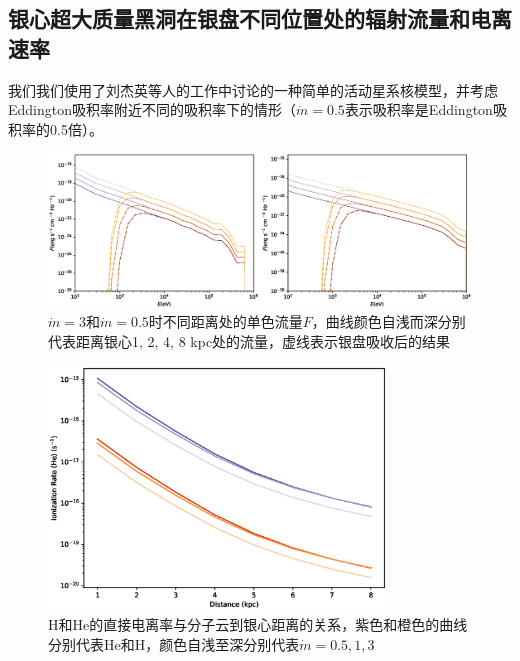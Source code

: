 \documentclass[UTF8]{article}
\begin{document}
\begin{fangsong}
\section{银心超大质量黑洞在银盘不同位置处的辐射流量和电离速率}
我们我们使用了刘杰英等人的工作中讨论的一种简单的活动星系核模型，并考虑Eddington吸积率附近不同的吸积率下的情形（$\dot{m}=0.5$表示吸积率是Eddington吸积率的0.5倍）。
\begin{figure}[H]
	\centering
	\includegraphics[width=\textwidth]{4.eps}
	\caption{$\dot{m}=3$和$\dot{m}=0.5$时不同距离处的单色流量$F$，曲线颜色自浅而深分别代表距离银心1, 2, 4, 8 kpc处的流量，虚线表示银盘吸收后的结果}
\end{figure}
\begin{figure}[H]
	\centering
	\includegraphics[width=0.8\textwidth]{3.eps}
	\caption{H和He的直接电离率与分子云到银心距离的关系，紫色和橙色的曲线分别代表He和H，颜色自浅至深分别代表$\dot{m}=0.5,1,3$}
\end{figure}

\end{fangsong}
\end{document}
